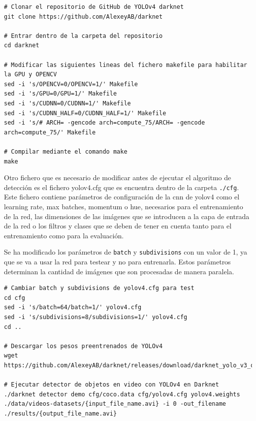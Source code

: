 \vspace{0.5cm}
\begin{lstlisting}[language=iPython,caption=Evaluación del detector de objetos YOLOv4 en Darknet (1),captionpos=b,label={lst:evaluate-yolov4-darknet1}]
# Clonar el repositorio de GitHub de YOLOv4 darknet
git clone https://github.com/AlexeyAB/darknet

# Entrar dentro de la carpeta del repositorio
cd darknet

# Modificar las siguientes lineas del fichero makefile para habilitar la GPU y OPENCV
sed -i 's/OPENCV=0/OPENCV=1/' Makefile
sed -i 's/GPU=0/GPU=1/' Makefile
sed -i 's/CUDNN=0/CUDNN=1/' Makefile
sed -i 's/CUDNN_HALF=0/CUDNN_HALF=1/' Makefile
sed -i 's/# ARCH= -gencode arch=compute_75/ARCH= -gencode arch=compute_75/' Makefile

# Compilar mediante el comando make
make
\end{lstlisting}

Otro fichero que es necesario de modificar antes de ejecutar el algoritmo de detección es el fichero yolov4.cfg que es encuentra dentro de la carpeta \texttt{./cfg}. Este fichero contiene parámetros de configuración de la \gls{cnn} de \gls{yolov4} como el learning rate, max batches, momentum o hue, necesarios para el entrenamiento de la red, las dimensiones de las imágenes que se introducen a la capa de entrada de la red o los filtros y clases que se deben de tener en cuenta tanto para el entrenamiento como para la evaluación.

Se ha modificado los parámetros de \texttt{batch} y \texttt{subdivisions} con un valor de 1, ya que se va a usar la red para testear y no para entrenarla. Estos parámetros determinan la cantidad de imágenes que son procesadas de manera paralela.

\vspace{0.5cm}
\begin{lstlisting}[language=iPython,caption=Evaluación del detector de objetos YOLOv4 en Darknet (2),captionpos=b,label={lst:evaluate-yolov4-darknet2}]
# Cambiar batch y subdivisions de yolov4.cfg para test
cd cfg
sed -i 's/batch=64/batch=1/' yolov4.cfg
sed -i 's/subdivisions=8/subdivisions=1/' yolov4.cfg
cd ..

# Descargar los pesos preentrenados de YOLOv4
wget https://github.com/AlexeyAB/darknet/releases/download/darknet_yolo_v3_optimal/yolov4.weights

# Ejecutar detector de objetos en video con YOLOv4 en Darknet
./darknet detector demo cfg/coco.data cfg/yolov4.cfg yolov4.weights ./data/videos-datasets/{input_file_name.avi} -i 0 -out_filename ./results/{output_file_name.avi}
\end{lstlisting}

